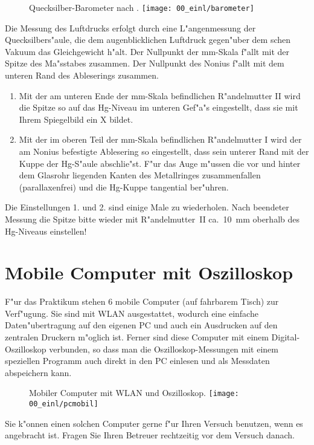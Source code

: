 \begin{figure}[htb]
 \begin{captionbeside}{\label{a:barometer}Quecksilber-Barometer nach .}
 \texttt{[image: 00\_einl/barometer]}
\end{captionbeside}
\end{figure}

Die Messung des Luftdrucks erfolgt durch eine L"angenmessung der
Quecksilbers"aule, die dem augenblicklichen Luftdruck gegen"uber dem
schen Vakuum das Gleichgewicht h"alt. Der
Nullpunkt der mm-Skala f"allt mit der Spitze des Ma"sstabes
zusammen. Der Nullpunkt des Nonius f"allt mit dem
unteren Rand des Ableserings zusammen.

\begin{enumerate}
    \item Mit der am unteren Ende der mm-Skala befindlichen R"andelmutter II
wird die Spitze so auf das Hg-Niveau im unteren Gef"a"s eingestellt,
dass sie mit Ihrem Spiegelbild ein X bildet.
    \item Mit der im oberen Teil der mm-Skala befindlichen R"andelmutter I
wird der am Nonius befestigte Ablesering so eingestellt, dass sein
unterer Rand mit der Kuppe der Hg-S"aule abschlie"st. F"ur das Auge
m"ussen die vor und hinter dem Glasrohr liegenden Kanten des
Metallringes zusammenfallen (parallaxenfrei) und die Hg-Kuppe
tangential ber"uhren.
\end{enumerate}


Die Einstellungen 1. und 2. sind einige Male zu wiederholen. Nach
beendeter Messung die Spitze bitte wieder mit R"andelmutter~II
ca.~10~mm oberhalb des Hg-Niveaus einstellen!



\section{Mobile Computer mit Oszilloskop}

F"ur das Praktikum stehen 6 mobile Computer (auf fahrbarem Tisch) zur
Verf"ugung. Sie sind mit WLAN ausgestattet, wodurch eine einfache
Daten"ubertragung auf den eigenen PC und auch ein Ausdrucken auf den
zentralen Druckern m"oglich ist. Ferner sind diese Computer mit einem
Digital-Oszilloskop verbunden, so dass man die Oszilloskop-Messungen
mit einem speziellen Programm auch direkt in den PC einlesen und als
Messdaten abspeichern kann.
%
\begin{figure}[htb]
 \begin{captionbeside}{\label{a:pcmobil}Mobiler Computer mit WLAN und Oszilloskop.}
 \texttt{[image: 00\_einl/pcmobil]}
\end{captionbeside}
\end{figure}
%
Sie k"onnen einen solchen Computer gerne f"ur Ihren Versuch benutzen,
wenn es angebracht ist. Fragen Sie Ihren Betreuer rechtzeitig vor
dem Versuch danach.


